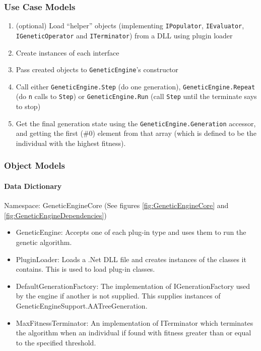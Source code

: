 \subsubsection{Use Case Models}
% 
\begin{enumerate}
 \item (optional) Load ``helper'' objects (implementing \texttt{IPopulator}, \texttt{IEvaluator}, \texttt{IGeneticOperator} and \texttt{ITerminator}) from a DLL using plugin loader
 \item Create instances of each interface
 \item Pass created objects to \texttt{GeneticEngine}'s constructor
 \item Call either \texttt{GeneticEngine.Step} (do one generation), \texttt{GeneticEngine.Repeat} (do \texttt{n} calls to \texttt{Step}) or \texttt{GeneticEngine.Run} (call \texttt{Step} until the terminate says to stop) 
 \item Get the final generation state using the \texttt{GeneticEngine.Generation} accessor, and getting the first (\#0) element from that array (which is defined to be the individual with the highest fitness).
\end{enumerate}

\subsubsection{Object Models}
\paragraph{Data Dictionary}

Namespace: GeneticEngineCore (See figures \ref{fig:GeneticEngineCore} and \ref{fig:GeneticEngineDependencies})
\begin{itemize}
\item GeneticEngine: Accepts one of each plug-in type and uses them to run the genetic algorithm.
\item PluginLoader: Loads a .Net DLL file and creates instances of the classes it contains. This is used to load plug-in classes.
\item DefaultGenerationFactory: The implementation of IGenerationFactory used by the engine if another is not supplied. This supplies instances of GeneticEngineSupport.AATreeGeneration.
\item MaxFitnessTerminator: An implementation of ITerminator which terminates the algorithm when an individual if found with fitness greater than or equal to the specified threshold.
\end{itemize}

